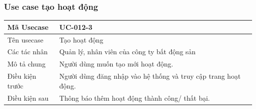 \documentclass[12pt,a4paper]{article}
\begin{document}
    \subsubsection*{Use case tạo hoạt động}
    \begin{table}[H]
        \centering
        \begin{tabular}{|p{3.5cm}|p{11.5cm}|c|}
            \hline
            Mã Usecase      & UC-012-3                                                       \\
            \hline
            Tên usecase     & Tạo hoạt động                                                  \\
            \hline
            Các tác nhân    & Quản lý, nhân viên của công ty bất động sản                    \\
            \hline
            Mô tả chung     & Người dùng muốn tạo mới hoạt động.                             \\
            \hline

            Điều kiện trước & Người dùng đăng nhập vào hệ thống và truy cập trang hoạt động. \\
            \hline

            Điều kiện sau   & Thông báo thêm hoạt động thành công/ thất bại.                 \\
            \hline


\end{tabular}
\end{table}
\end{document}
